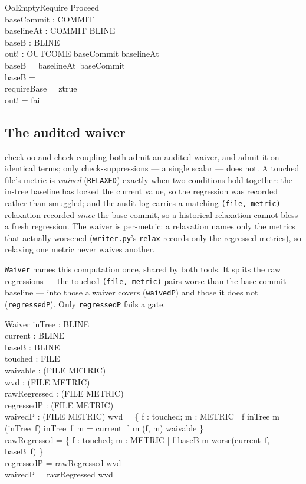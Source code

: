 \documentclass[a4paper,10pt,fleqn]{article}
\begin{document}
\begin{schema}{OoEmptyRequire}
Proceed \\
baseCommit : COMMIT \\
baselineAt : COMMIT \pfun BLINE \\
baseB : BLINE \\
out! : OUTCOME
\where
baseCommit \in \dom baselineAt \\
baseB = baselineAt~baseCommit \\
baseB = \emptyset \\
requireBase = ztrue \\
out! = fail
\end{schema}

\subsection{The audited waiver}

check-oo and check-coupling both admit an audited waiver, and admit it on
identical terms; only check-suppressions --- a single scalar --- does not. A
touched file's metric is \emph{waived} (\texttt{RELAXED}) exactly when two
conditions hold together: the in-tree baseline has locked the current value, so
the regression was recorded rather than smuggled; and the audit log carries a
matching \texttt{(file, metric)} relaxation recorded \emph{since} the base
commit, so a historical relaxation cannot bless a fresh regression. The waiver
is per-metric: a relaxation names only the metrics that actually worsened
(\texttt{writer.py}'s \texttt{relax} records only the regressed metrics), so
relaxing one metric never waives another.

\texttt{Waiver} names this computation once, shared by both tools. It splits the
raw regressions --- the touched \texttt{(file, metric)} pairs worse than the
base-commit baseline --- into those a waiver covers (\texttt{waivedP}) and those
it does not (\texttt{regressedP}). Only \texttt{regressedP} fails a gate.

\begin{schema}{Waiver}
inTree : BLINE \\
current : BLINE \\
baseB : BLINE \\
touched : \finset FILE \\
waivable : \finset (FILE \cross METRIC) \\
wvd : \finset (FILE \cross METRIC) \\
rawRegressed : \finset (FILE \cross METRIC) \\
regressedP : \finset (FILE \cross METRIC) \\
waivedP : \finset (FILE \cross METRIC)
\where
wvd = \{ f : touched; m : METRIC | f \in \dom inTree \land m \in \dom (inTree~f) \land inTree~f~m = current~f~m \land (f, m) \in waivable \} \\
rawRegressed = \{ f : touched; m : METRIC | f \in \dom baseB \land m \in worse(current~f, baseB~f) \} \\
regressedP = rawRegressed \setminus wvd \\
waivedP = rawRegressed \cap wvd
\end{schema}
\end{document}
